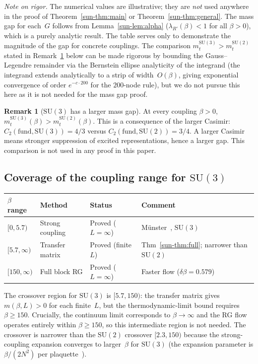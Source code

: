 \documentclass[11pt]{article}
\theoremstyle{definition}
\newtheorem{remark}[theorem]{Remark}
\newcommand{\SU}{\mathrm{SU}}
\begin{document}
\emph{Note on rigor.}
The numerical values are illustrative; they are
\emph{not} used anywhere in the proof of
Theorem~\ref{sun-thm:main} or Theorem~\ref{sun-thm:general}.
The mass gap for each~$G$ follows from
Lemma~\ref{sun-lem:alpha} ($\lambda_{R'}(\beta)<1$ for all
$\beta>0$), which is a purely analytic result.
The table serves only to demonstrate the magnitude of
the gap for concrete couplings.
The comparison $m_t^{\SU(3)}>m_t^{\SU(2)}$ stated in
Remark~\ref{sun-rem:su3-gap} below can be made rigorous by
bounding the Gauss--Legendre remainder via the
Bernstein ellipse analyticity of the integrand (the
integrand extends analytically to a strip of
width~$O(\beta)$, giving exponential convergence of
order $e^{-c\cdot 200}$ for the $200$-node rule),
but we do not pursue this here as it is not needed for
the mass gap proof.

\begin{remark}[$\SU(3)$ has a larger mass gap]
\label{sun-rem:su3-gap}
At every coupling $\beta>0$,
$m_t^{\SU(3)}(\beta)>m_t^{\SU(2)}(\beta)$.
This is a consequence of the larger Casimir:
$C_2(\mathrm{fund},\SU(3))=4/3$ versus
$C_2(\mathrm{fund},\SU(2))=3/4$.
A larger Casimir means stronger suppression of excited
representations, hence a larger gap.
This comparison is not used in any proof in this paper.
\end{remark}

\subsection{Coverage of the coupling range for $\SU(3)$}

\begin{center}
\renewcommand{\arraystretch}{1.2}
\begin{tabular}{@{}p{3cm}llp{5cm}@{}}
\toprule
\textbf{$\beta$ range} & \textbf{Method} &
\textbf{Status} & \textbf{Comment} \\
\midrule
$[0,5.7)$ & Strong coupling & Proved ($L=\infty$) &
M\"unster~\cite{Munster81}, $\SU(3)$ \\
$[5.7,\infty)$ & Transfer matrix & Proved (finite $L$) &
Thm~\ref{sun-thm:full}; narrower than $\SU(2)$\\
$[150,\infty)$ & Full block RG & Proved ($L=\infty$) &
Faster flow ($\delta\beta=0.579$) \\
\bottomrule
\end{tabular}
\end{center}

The crossover region for $\SU(3)$ is $[5.7,150)$: the
transfer matrix gives $m(\beta,L)>0$ for each finite~$L$,
but the thermodynamic-limit bound requires $\beta\ge 150$.
Crucially, the continuum limit corresponds to
$\beta\to\infty$ and the RG flow operates entirely within
$\beta\ge 150$, so this intermediate region is not needed.
The crossover is narrower than the $\SU(2)$ crossover
$[2.3,150)$ because the strong-coupling
expansion converges to larger~$\beta$ for $\SU(3)$
(the expansion parameter is $\beta/(2N^2)$ per
plaquette~\cite{Munster81}).
\end{document}
